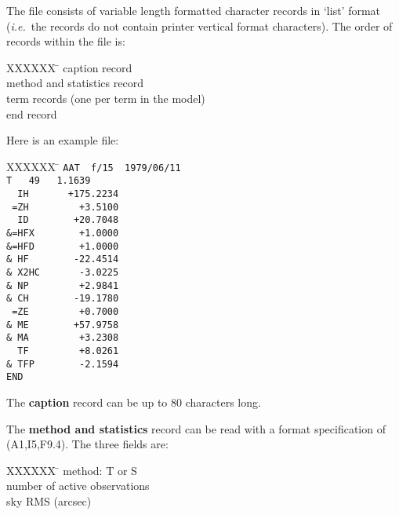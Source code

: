 The file consists of variable length formatted character
records in `list' format ({\it i.e.}\ the records do not contain
printer vertical format characters).  The order of records
within the file is:

\begin{tabs}
XXXXXX \= \kill
\> caption record \\
\> method and statistics record \\
\> term records (one per term in the model) \\
\> end record
\end{tabs}

\goodbreak
Here is an example file:

\begin{tabs}
XXXXXX \= \kill
\> \verb*|AAT  f/15  1979/06/11| \\
\> \verb*|T   49   1.1639| \\
\> \verb*|  IH       +175.2234| \\
\> \verb*| =ZH         +3.5100| \\
\> \verb*|  ID        +20.7048| \\
\> \verb*|&=HFX        +1.0000| \\
\> \verb*|&=HFD        +1.0000| \\
\> \verb*|& HF        -22.4514| \\
\> \verb*|& X2HC       -3.0225| \\
\> \verb*|& NP         +2.9841| \\
\> \verb*|& CH        -19.1780| \\
\> \verb*| =ZE         +0.7000| \\
\> \verb*|& ME        +57.9758| \\
\> \verb*|& MA         +3.2308| \\
\> \verb*|  TF         +8.0261| \\
\> \verb*|& TFP        -2.1594| \\
\> \verb*|END| \\
\end{tabs}

The {\bf caption} record can be up to 80 characters long.

The {\bf method and statistics} record can be read with a format
specification of (A1,I5,F9.4).  The three fields are:

\begin{tabs}
XXXXXX \= \kill
\> method:  T or S \\
\> number of active observations \\
\> sky RMS (arcsec)
\end{tabs}

